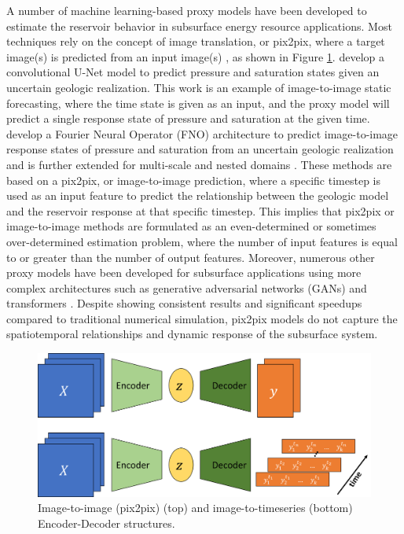 \documentclass[10pt, twoside]{article}
\begin{document}
A number of machine learning-based proxy models have been developed to estimate the reservoir behavior in subsurface energy resource applications. Most techniques rely on the concept of image translation, or pix2pix, where a target image(s) is predicted from an input image(s) \cite{Pan2021, Sebacher2022, Bao2022, Ronneberger2015}, as shown in Figure \ref{pix2N}. \citet{Maldonado2021Unet} develop a convolutional U-Net model to predict pressure and saturation states given an uncertain geologic realization. This work is an example of image-to-image static forecasting, where the time state is given as an input, and the proxy model will predict a single response state of pressure and saturation at the given time. \citet{WEN2022104180} develop a Fourier Neural Operator (FNO) architecture to predict image-to-image response states of pressure and saturation from an uncertain geologic realization and is further extended for multi-scale and nested domains \cite{Wen2023Operators}. These methods are based on a pix2pix, or image-to-image prediction, where a specific timestep is used as an input feature to predict the relationship between the geologic model and the reservoir response at that specific timestep. This implies that pix2pix or image-to-image methods are formulated as an even-determined or sometimes over-determined estimation problem, where the number of input features is equal to or greater than the number of output features. Moreover, numerous other proxy models have been developed for subsurface applications using more complex architectures such as generative adversarial networks (GANs) \cite{jo2021machine} and transformers \cite{zhang2023evaluating, zhang2023efficient}. Despite showing consistent results and significant speedups compared to traditional numerical simulation, pix2pix models do not capture the spatiotemporal relationships and dynamic response of the subsurface system.

\begin{figure}
    \centering
    \includegraphics[width=13.5cm]{figures/pix2N.png}
    \caption{Image-to-image (pix2pix) (top) and image-to-timeseries (bottom) Encoder-Decoder structures.}
    \label{pix2N}
\end{figure}
\end{document}
